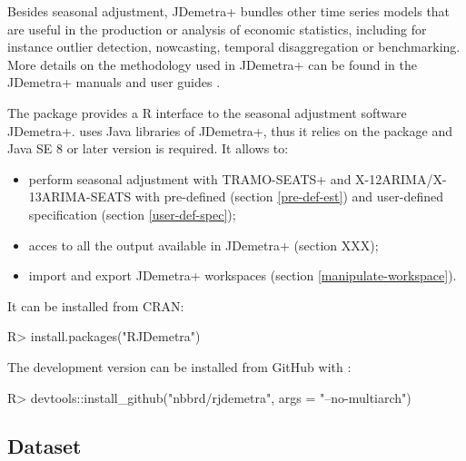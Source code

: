 \documentclass[article]{jss}
\providecommand{\tightlist}{%
  \setlength{\itemsep}{0pt}\setlength{\parskip}{0pt}}
\begin{document}
Besides seasonal adjustment, JDemetra+ bundles other time series models
that are useful in the production or analysis of economic statistics,
including for instance outlier detection, nowcasting, temporal
disaggregation or benchmarking. More details on the methodology used in
JDemetra+ can be found in the JDemetra+ manuals and user guides
\citep{grudkowska2015jdemetrarm, grudkowska2015jdemetraug}.

The package  provides a R interface to the seasonal
adjustment software JDemetra+.  uses Java libraries of
JDemetra+, thus it relies on the  \citep{rJava} package and
Java SE 8 or later version is required. It allows to:

\begin{itemize}
\tightlist
\item
  perform seasonal adjustment with TRAMO-SEATS+ and
  X-12ARIMA/X-13ARIMA-SEATS with pre-defined (section \ref{pre-def-est})
  and user-defined specification (section \ref{user-def-spec});\\
\item
  acces to all the output available in JDemetra+ (section XXX);\\
\item
  import and export JDemetra+ workspaces (section
  \ref{manipulate-workspace}).
\end{itemize}

It can be installed from CRAN:

\begin{CodeChunk}

\begin{CodeInput}
R> install.packages("RJDemetra")
\end{CodeInput}
\end{CodeChunk}

The development version can be installed from GitHub with 
\citep{devtools}:

\begin{CodeChunk}

\begin{CodeInput}
R> devtools::install_github("nbbrd/rjdemetra", args = "--no-multiarch")
\end{CodeInput}
\end{CodeChunk}

\hypertarget{dataset}{%
\subsection{Dataset}\label{dataset}}
\end{document}
